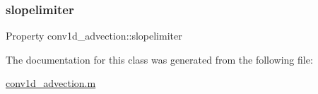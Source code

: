 \mbox{\label{classconv1d__advection_afe0ed6735a693af3b1febc0959133fa3}} 
\subsubsection{\texorpdfstring{slopelimiter}{slopelimiter}}
{\footnotesize\ttfamily Property conv1d\+\_\+advection\+::slopelimiter\hspace{0.3cm}{\ttfamily [protected]}}



The documentation for this class was generated from the following file\+:\begin{DoxyCompactItemize}
\item 
\hyperlink{conv1d__advection_8m}{conv1d\+\_\+advection.\+m}\end{DoxyCompactItemize}
